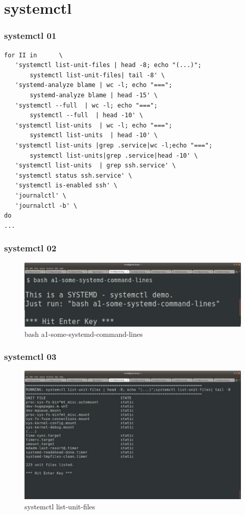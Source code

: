 \documentclass[xcolor=table, notheorems, hyperref={pdfpagelabels=false}]{beamer}
\begin{document}
\section{systemctl}
\begin{frame}[fragile]
\frametitle{systemctl 01}
\begin{lstlisting}[basicstyle=\ttfamily\small]
for II in      \
   'systemctl list-unit-files | head -8; echo "(...)";
       systemctl list-unit-files| tail -8' \
   'systemd-analyze blame | wc -l; echo "===";
       systemd-analyze blame | head -15' \
   'systemctl --full  | wc -l; echo "===";
       systemctl --full  | head -10' \
   'systemctl list-units  | wc -l; echo "===";
       systemctl list-units  | head -10' \
   'systemctl list-units |grep .service|wc -l;echo "===";
       systemctl list-units|grep .service|head -10' \
   'systemctl list-units  | grep ssh.service' \
   'systemctl status ssh.service' \
   'systemctl is-enabled ssh' \
   'journalctl' \
   'journalctl -b' \
do
...
\end{lstlisting}

\end{frame}

\begin{frame}[fragile]
\frametitle{systemctl 02}
\begin{figure}
\includegraphics[width=.93\linewidth]{os-systemd01.jpg}
\caption{bash a1-some-systemd-command-lines}
\end{figure}
\end{frame}

\begin{frame}[fragile]
\frametitle{systemctl 03}
\begin{figure}
\includegraphics[width=.93\linewidth]{os-systemd02.jpg}
\caption{systemctl list-unit-files}
\end{figure}
\end{frame}
\end{document}
